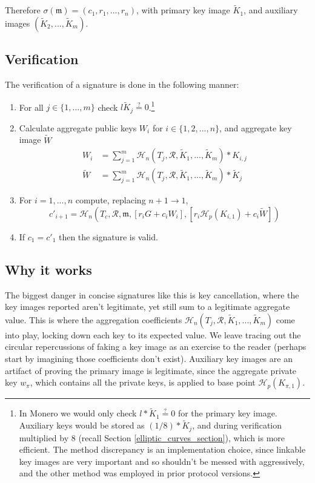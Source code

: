 Therefore \(\sigma(\mathfrak{m}) = (c_1, r_1, ..., r_n) \), with primary key image $\tilde{K}_1$, and auxiliary images $(\tilde{K}_2,...,\tilde{K}_{m})$.


\subsection*{Verification}

The verification of a signature is done in the following manner:

\begin{enumerate}
    \item For all $j \in \{1,...,m\}$ check $l \tilde{K}_j \stackrel{?}{=} 0$.\footnote{In Monero we would only check $l*\tilde{K}_1 \stackrel{?}{=} 0$ for the primary key image. Auxiliary keys would be stored as $(1/8)*\tilde{K}_j$, and during verification multiplied by 8 (recall Section \ref{elliptic_curves_section}), which is more efficient. The method discrepancy is an implementation choice, since linkable key images are very important and so shouldn't be messed with aggressively, and the other method was employed in prior protocol versions.}

    \item Calculate aggregate public keys $W_i$ for \(i \in \{1, 2, ..., n\}\), and aggregate key image $\tilde{W}$\vspace{.175cm}
    \begin{align*}
    W_i &= \sum^{m}_{j=1} \mathcal{H}_n(T_j, \mathcal{R}, \tilde{K}_1,...,\tilde{K}_{m})*K_{i,j}\\
    \tilde{W} &= \sum^{m}_{j=1} \mathcal{H}_n(T_j, \mathcal{R}, \tilde{K}_1,...,\tilde{K}_{m})*\tilde{K}_j
    \end{align*}{}

	\item For \(i = 1, ..., n\) compute, replacing \(n + 1 \rightarrow 1\),\vspace{.175cm}
	\[c'_{i+1} = \mathcal{H}_n(T_c, \mathcal{R}, \mathfrak{m}, [r_i G + c_i W_i], [r_{i} \mathcal{H}_p(K_{i,1}) + c_i \tilde{W}])\]

	\item If \(c_1 = c'_1\) then the signature is valid.
\end{enumerate}


\subsection*{Why it works}

The biggest danger in concise signatures like this is key cancellation, where the key images reported aren't legitimate, yet still sum to a legitimate aggregate value. This is where the aggregation coefficients $\mathcal{H}_n(T_j, \mathcal{R}, \tilde{K}_1,...,\tilde{K}_{m})$ come into play, locking down each key to its expected value. We leave tracing out the circular repercussions of faking a key image as an exercise to the reader (perhaps start by imagining those coefficients don't exist). Auxiliary key images are an artifact of proving the primary image is legitimate, since the aggregate private key $w_{\pi}$, which contains all the private keys, is applied to base point $\mathcal{H}_p(K_{\pi,1})$.


